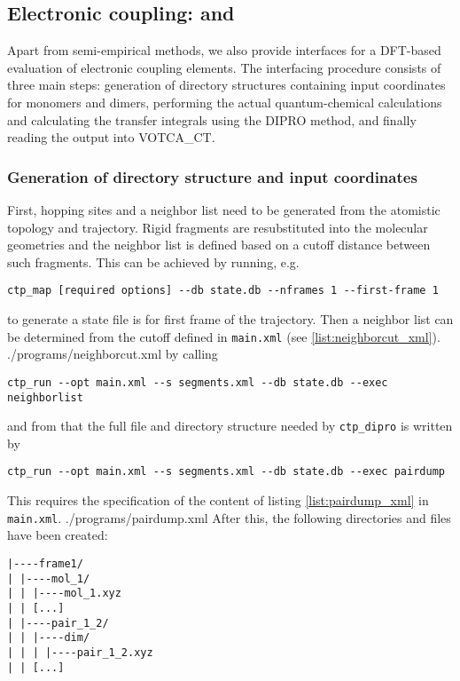 \subsection{Electronic coupling: \gaussian and \turbomole}

Apart from semi-empirical methods, we also provide interfaces for a DFT-based evaluation of electronic coupling elements. The interfacing procedure consists of three main steps: generation of directory structures containing input coordinates for monomers and dimers, performing the actual quantum-chemical calculations and calculating the transfer integrals using the DIPRO method, and finally reading the output into VOTCA\_CT.
\subsubsection{Generation of directory structure and input coordinates}
First, hopping sites and a neighbor list need to be generated from the atomistic topology and trajectory. Rigid fragments are resubstituted into the molecular geometries and the neighbor list is defined based on a cutoff distance between such fragments. This can be achieved by running, e.g.  
\begin{verbatim}
ctp_map [required options] --db state.db --nframes 1 --first-frame 1
\end{verbatim}
to generate a state file is for first frame of the trajectory. Then a neighbor list can be determined from the cutoff defined in {\tt main.xml} (see \ref{list:neighborcut_xml}).
 {./programs/neighborcut.xml}
by calling
\begin{verbatim}
ctp_run --opt main.xml --s segments.xml --db state.db --exec neighborlist
\end{verbatim}
and from that the full file and directory structure needed by {\tt ctp\_dipro} is written by 
\begin{verbatim}
ctp_run --opt main.xml --s segments.xml --db state.db --exec pairdump
\end{verbatim}
This requires the specification of the content of listing \ref{list:pairdump_xml} in {\tt main.xml}.
 {./programs/pairdump.xml}
After this, the following directories and files have been created:
\begin{verbatim}
|----frame1/
| |----mol_1/
| | |----mol_1.xyz
| | [...]
| |----pair_1_2/
| | |----dim/
| | | |----pair_1_2.xyz
| | [...]
\end{verbatim}

